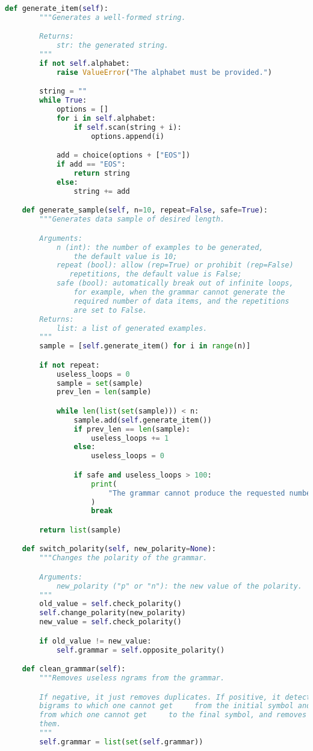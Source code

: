 \begin{lstlisting}[language=Python]
    def generate_item(self):
        """Generates a well-formed string.

        Returns:
            str: the generated string.
        """
        if not self.alphabet:
            raise ValueError("The alphabet must be provided.")

        string = ""
        while True:
            options = []
            for i in self.alphabet:
                if self.scan(string + i):
                    options.append(i)

            add = choice(options + ["EOS"])
            if add == "EOS":
                return string
            else:
                string += add

    def generate_sample(self, n=10, repeat=False, safe=True):
        """Generates data sample of desired length.

        Arguments:
            n (int): the number of examples to be generated,
                the default value is 10;
            repeat (bool): allow (rep=True) or prohibit (rep=False)
               repetitions, the default value is False;
            safe (bool): automatically break out of infinite loops,
                for example, when the grammar cannot generate the
                required number of data items, and the repetitions
                are set to False.
        Returns:
            list: a list of generated examples.
        """
        sample = [self.generate_item() for i in range(n)]

        if not repeat:
            useless_loops = 0
            sample = set(sample)
            prev_len = len(sample)

            while len(list(set(sample))) < n:
                sample.add(self.generate_item())
                if prev_len == len(sample):
                    useless_loops += 1
                else:
                    useless_loops = 0

                if safe and useless_loops > 100:
                    print(
                        "The grammar cannot produce the requested number" " of strings."
                    )
                    break

        return list(sample)

    def switch_polarity(self, new_polarity=None):
        """Changes the polarity of the grammar.

        Arguments:
            new_polarity ("p" or "n"): the new value of the polarity.
        """
        old_value = self.check_polarity()
        self.change_polarity(new_polarity)
        new_value = self.check_polarity()

        if old_value != new_value:
            self.grammar = self.opposite_polarity()

    def clean_grammar(self):
        """Removes useless ngrams from the grammar.

        If negative, it just removes duplicates. If positive, it detects
        bigrams to which one cannot get     from the initial symbol and
        from which one cannot get     to the final symbol, and removes
        them.
        """
        self.grammar = list(set(self.grammar))
\end{lstlisting}

